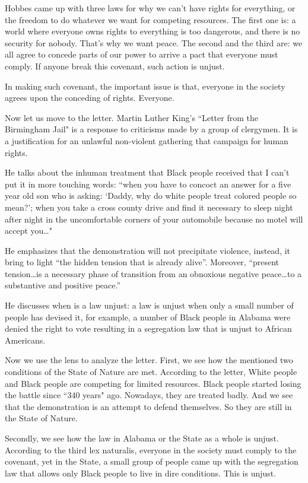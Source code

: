 \documentclass{article}
\begin{document}
Hobbes came up with three laws for why we can't have rights for everything, or the freedom to do whatever we want for competing resources. The first one is: a world where everyone owns rights to everything is too dangerous, and there is no security for nobody. That's why we want peace. The second and the third are: we all agree to concede parts of our power to arrive a pact that everyone must comply. If anyone break this covenant, such action is unjust.

In making such covenant, the important issue is that, everyone in the society agrees upon the conceding of rights. Everyone.

Now let us move to the letter. Martin Luther King's ``Letter from the Birmingham Jail" is a response to criticisms made by a group of clergymen. It is a justification for an unlawful non-violent gathering that campaign for human rights.

He talks about the inhuman treatment that Black people received that I can't put it in more touching words: ``when you have to concoct an answer for a five year old son who is asking: `Daddy, why do white people treat colored people so mean?'; when you take a cross county drive and find it necessary to sleep night after night in the uncomfortable corners of your automobile because no motel will accept you\ldots"

He emphasizes that the demonstration will not precipitate violence, instead, it bring to light “the hidden tension that is already alive”. Moreover, “present tension\ldots is a necessary phase of transition from an obnoxious negative peace\ldots to a substantive and positive peace.”

He discusses when is a law unjust: a law is unjust when only a small number of people has devised it, for example, a number of Black people in Alabama were denied the right to vote resulting in a segregation law that is unjust to African Americans.

Now we use the lens to analyze the letter. First, we see how the mentioned two conditions of the State of Nature are met. According to the letter, White people and Black people are competing for limited resources. Black people started losing the battle since ``340 years" ago. Nowadays, they are treated badly. And we see that the demonstration is an attempt to defend themselves. So they are still in the State of Nature.

Secondly, we see how the law in Alabama or the State as a whole is unjust. According to the third lex naturalis, everyone in the society must comply to the covenant, yet in the State, a small group of people came up with the segregation law that allows only Black people to live in dire conditions. This is unjust. 
\end{document}
